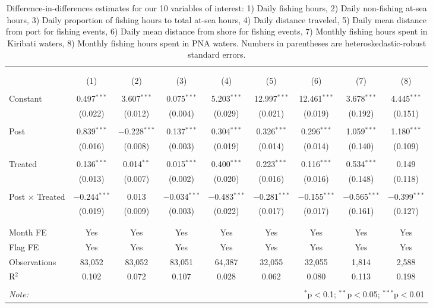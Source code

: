 
\begin{table}[!htbp] \centering 
  \caption{\label{tab:main_DID}Difference-in-differences estimates for our 10 variables of interest: 1) Daily fishing hours, 2) Daily non-fishing at-sea hours, 3) Daily proportion of fishing hours to total at-sea hours, 4) Daily distance traveled, 5) Daily mean distance from port for fishing events, 6) Daily mean distance from shore for fishing events, 7) Monthly fishing hours spent in Kiribati waters, 8) Monthly fishing hours spent in PNA waters. Numbers in parentheses are heteroskedastic-robust standard errors.} 
  \label{} 
\footnotesize 
\begin{tabular}{@{\extracolsep{1pt}}lcccccccc} 
\\[-1.8ex]\hline 
\hline \\[-1.8ex] 
\\[-1.8ex] & (1) & (2) & (3) & (4) & (5) & (6) & (7) & (8)\\ 
\hline \\[-1.8ex] 
 Constant & 0.497$^{***}$ & 3.607$^{***}$ & 0.075$^{***}$ & 5.203$^{***}$ & 12.997$^{***}$ & 12.461$^{***}$ & 3.678$^{***}$ & 4.445$^{***}$ \\ 
  & (0.022) & (0.012) & (0.004) & (0.029) & (0.021) & (0.019) & (0.192) & (0.151) \\ 
  & & & & & & & & \\ 
 Post & 0.839$^{***}$ & $-$0.228$^{***}$ & 0.137$^{***}$ & 0.304$^{***}$ & 0.326$^{***}$ & 0.296$^{***}$ & 1.059$^{***}$ & 1.180$^{***}$ \\ 
  & (0.016) & (0.008) & (0.003) & (0.019) & (0.014) & (0.014) & (0.140) & (0.109) \\ 
  & & & & & & & & \\ 
 Treated & 0.136$^{***}$ & 0.014$^{**}$ & 0.015$^{***}$ & 0.400$^{***}$ & 0.223$^{***}$ & 0.116$^{***}$ & 0.534$^{***}$ & 0.149 \\ 
  & (0.013) & (0.007) & (0.002) & (0.020) & (0.016) & (0.016) & (0.148) & (0.118) \\ 
  & & & & & & & & \\ 
 Post $\times$ Treated & $-$0.244$^{***}$ & 0.013 & $-$0.034$^{***}$ & $-$0.483$^{***}$ & $-$0.281$^{***}$ & $-$0.155$^{***}$ & $-$0.565$^{***}$ & $-$0.399$^{***}$ \\ 
  & (0.019) & (0.009) & (0.003) & (0.022) & (0.017) & (0.017) & (0.161) & (0.127) \\ 
  & & & & & & & & \\ 
\hline \\[-1.8ex] 
Month FE & Yes & Yes & Yes & Yes & Yes & Yes & Yes & Yes \\ 
Flag FE & Yes & Yes & Yes & Yes & Yes & Yes & Yes & Yes \\ 
Observations & 83,052 & 83,052 & 83,051 & 64,387 & 32,055 & 32,055 & 1,814 & 2,588 \\ 
R$^{2}$ & 0.102 & 0.072 & 0.107 & 0.028 & 0.062 & 0.080 & 0.113 & 0.198 \\ 
\hline 
\hline \\[-1.8ex] 
\textit{Note:}  & \multicolumn{8}{r}{$^{*}$p$<$0.1; $^{**}$p$<$0.05; $^{***}$p$<$0.01} \\ 
\end{tabular} 
\end{table} 
